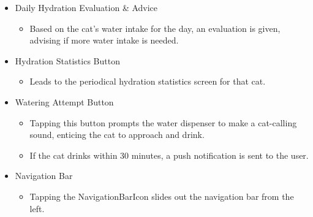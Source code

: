 \documentclass[conference]{IEEEtran}
\begin{document}
\begin{itemize}
    \item Daily Hydration Evaluation \& Advice
    \begin{itemize}
        \item Based on the cat's water intake for the day, an evaluation is given, advising if more water intake is needed.
    \end{itemize}
    \item Hydration Statistics Button
    \begin{itemize}
        \item Leads to the periodical hydration statistics screen for that cat.
    \end{itemize}
    \item Watering Attempt Button
    \begin{itemize}
        \item Tapping this button prompts the water dispenser to make a cat-calling sound, enticing the cat to approach and drink.
        \item If the cat drinks within 30 minutes, a push notification is sent to the user.
    \end{itemize}
    \item Navigation Bar
    \begin{itemize}
        \item Tapping the NavigationBarIcon slides out the navigation bar from the left.\\
    \end{itemize}
\end{itemize}
\end{document}
